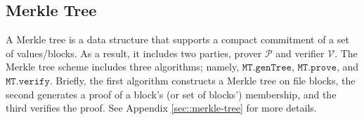 


\vs

\subsection{Merkle Tree}\label{sec::merkle-tree-short}


A Merkle tree is a data structure that supports a compact commitment of a set of values/blocks.  As a result, it includes two parties, prover $\mathcal{P}$ and verifier $\mathcal{V}$. 
%
The Merkle tree scheme includes three algorithms; namely, $\mathtt{MT.genTree}$, $ \mathtt{MT.prove}$, and  $\mathtt{MT.verify}$. Briefly, the first algorithm constructs a Merkle tree on file blocks, the second generates a proof of a block's (or set of blocks') membership, and the third verifies the proof. See Appendix \ref{sec::merkle-tree} for more details. 

%
%
%
%
%
%
